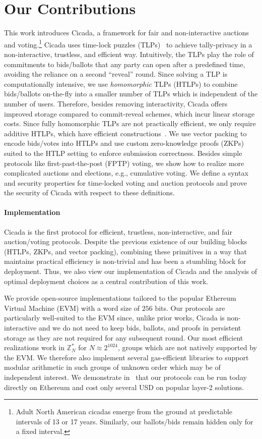 \section{Our Contributions}\label{sec:cicada_contrib}

This work introduces Cicada, a framework for fair and non-interactive auctions and voting.\footnote{Adult North American cicadas emerge from the ground at predictable intervals of 13 or 17 years. Similarly, our ballots/bids remain hidden only for a fixed interval.}
Cicada uses time-lock puzzles (TLPs)~\cite{RivShaWag96} to achieve tally-privacy in a non-interactive, trustless, and efficient way. Intuitively, the TLPs play the role of commitments to bids/ballots that any party can open after a predefined time, avoiding the reliance on a second ``reveal'' round. 
Since solving a TLP is computationally intensive, 
we use \emph{homomorphic} TLPs (HTLPs) to combine bids/ballots on-the-fly into a smaller number of TLPs which is independent of the number of users. Therefore, besides removing interactivity, Cicada offers improved storage compared to commit-reveal schemes, which incur linear storage costs. 
Since fully homomorphic TLPs are not practically efficient, we only require additive HTLPs, which have efficient constructions~\cite{C:MalThy19}. 
We use vector packing to encode bids/votes into HTLPs and use custom zero-knowledge proofs (ZKPs) suited to the HTLP setting to enforce submission correctness.
Besides simple protocols like first-past-the-post (FPTP) voting, we show how to realize more complicated auctions and elections, e.g., cumulative voting.
We define a syntax and security properties for time-locked voting and auction protocols and prove the security of Cicada with respect to these definitions.

\paragraph{Implementation}
Cicada is the first protocol for efficient, trustless, non\hyp interactive, and fair auction/voting protocols. 
Despite the previous existence of our building blocks (HTLPs, ZKPs, and vector packing), combining these primitives in a way that maintains practical efficiency is non-trivial and has been a stumbling block for deployment. Thus, we also view our implementation of Cicada and the analysis of optimal deployment choices 
as a central contribution of this work. 

We provide open-source implementations tailored to the popular Ethereum Virtual Machine (EVM) with a word size of $256$ bits. 
Our protocols are particularly well-suited to the EVM since, unlike prior works, Cicada is non-interactive and we do not need to keep bids, ballots, and proofs in persistent storage as they are not required for any subsequent round. 
Our most efficient realizations work in $\mathbb{Z}^{*}_{N}$ for $N\approx 2^{1024}$, groups which are not natively supported by the EVM. We therefore also implement several gas-efficient libraries to support modular arithmetic in such groups of unknown order which may be of independent interest. 
We demonstrate in~ that our protocols can be run today directly on Ethereum and cost only several USD on popular layer-2 solutions.

